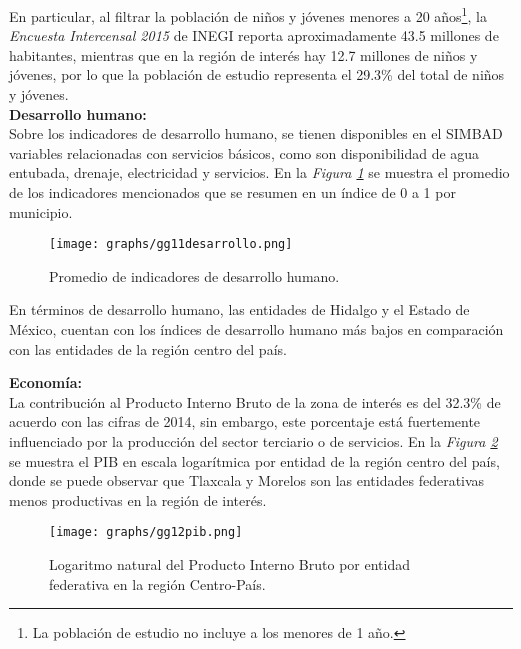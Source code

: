 \documentclass[11pt, oneside]{book}
\begin{document}
En particular, al filtrar la población de niños y jóvenes menores a 20 años\footnote{La población de estudio no incluye a los menores de 1 año.}, la \emph{Encuesta Intercensal 2015} de INEGI reporta aproximadamente 43.5 millones de habitantes, mientras que en la región de interés hay 12.7 millones de niños y jóvenes, por lo que la población de estudio representa el 29.3\% del total de niños y jóvenes.\\

\noindent \textbf{Desarrollo humano:}\\
\noindent Sobre los indicadores de desarrollo humano, se tienen disponibles en el SIMBAD variables relacionadas con servicios básicos, como son disponibilidad de agua entubada, drenaje, electricidad y servicios. En la \emph{Figura \ref{fig.11.desarrollo}} se muestra el promedio de los indicadores mencionados que se resumen en un índice de 0 a 1 por municipio.\\

\begin{figure}[ht]
    \centering    
    \texttt{[image: graphs/gg11desarrollo.png]}
  \caption{Promedio de indicadores de desarrollo humano.}
  \label{fig.11.desarrollo}
\end{figure}

En términos de desarrollo humano, las entidades de Hidalgo y el Estado de México, cuentan con los índices de desarrollo humano más bajos en comparación con las entidades de la región centro del país.\\

\newpage

\noindent \textbf{Economía:}\\
\noindent La contribución al Producto Interno Bruto de la zona de interés es del 32.3\% de acuerdo con las cifras de 2014, sin embargo, este porcentaje está fuertemente influenciado por la producción del sector terciario o de servicios. En la \emph{Figura \ref{fig.12.pib}} se muestra el PIB en escala logarítmica por entidad de la región centro del país, donde se puede observar que Tlaxcala y Morelos son las entidades federativas menos productivas en la región de interés.\\

\begin{figure}[ht]
    \centering    
    \texttt{[image: graphs/gg12pib.png]}
  \caption{Logaritmo natural del Producto Interno Bruto por entidad federativa en la región Centro-País.}
  \label{fig.12.pib}
\end{figure}
\end{document}
